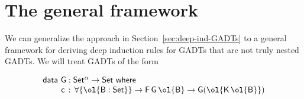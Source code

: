 \documentclass[sigplan,10pt,anonymous,review]{acmart}
\begin{document}
\vspace*{-0.05in}

\section{The general framework}\label{sec:framework}

We can generalize the approach in Section~\ref{sec:deep-ind-GADTs} to
a general framework for deriving deep induction rules for GADTs that
are not truly nested GADTs. We will treat GADTs of the form

\vspace*{-0.05in}

\begin{equation}\label{eq:gadts}
\begin{array}{l}
  \mathsf{data\ G : Set^\alpha
    \to Set\ where}\\
\mathsf{\;\;\;\;\;\;\;\;c\, :\, \forall \{\ol{B : Set}\} \to F\,G\,\ol{B} \to G (\ol{K\,\ol{B}})}
\end{array}
\end{equation}
\end{document}
